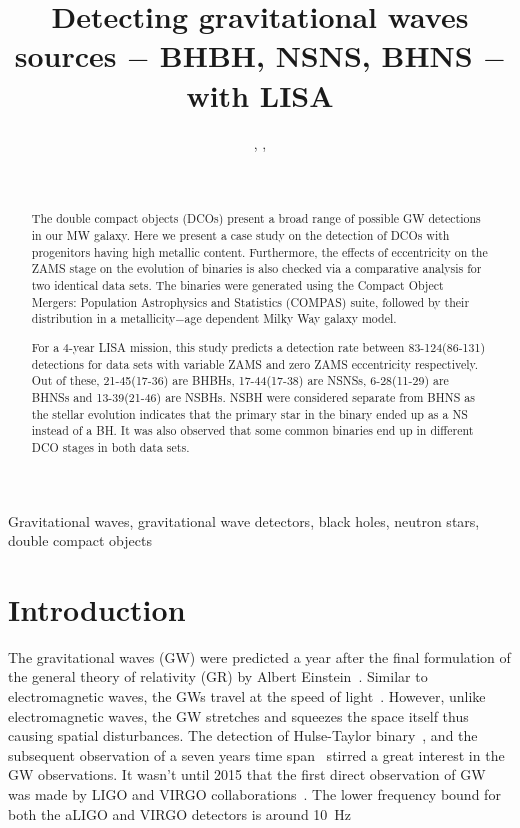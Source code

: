 \documentclass[journal, twocolumns]{IEEEtran}
\title{Detecting gravitational waves sources $-$ BHBH, NSNS, BHNS $-$ with LISA}
\author{
    \IEEEauthorblockN{Nazeela Aimen},
    \IEEEauthorblockN{Syed Ali Mohsin Bukhari},
    \IEEEauthorblockN{Asad Ali}
    \and\\
    \IEEEauthorblockA{
        \textit{
            Department of Applied Mathematics and Statistics, Institute of Space Technology, Islamabad 44000, Pakistan.
        }\\
    }
    \IEEEauthorblockA{
        \textit{
            Space and Astrophysics Research Lab (SARL), Institute of Space Technology, Islamabad 44000, Pakistan.
        }
    }
}
\begin{document}
    \maketitle
    \IEEEpeerreviewmaketitle
    \begin{abstract}
        The double compact objects (DCOs) present a broad range of possible GW detections in our MW galaxy. Here we present a case study on the detection of DCOs with progenitors having high metallic content. Furthermore, the effects of eccentricity on the ZAMS stage on the evolution of binaries is also checked via a comparative analysis for two identical data sets. The binaries were generated using the Compact Object Mergers: Population Astrophysics and Statistics (COMPAS) suite, followed by their distribution in a metallicity$-$age dependent Milky Way galaxy model.

        For a 4-year LISA mission, this study predicts a detection rate between 83-124(86-131) detections for data sets with variable ZAMS and zero ZAMS eccentricity respectively. Out of these, 21-45(17-36) are BHBHs, 17-44(17-38) are NSNSs, 6-28(11-29) are BHNSs and 13-39(21-46) are NSBHs.
        NSBH were considered separate from BHNS as the stellar evolution indicates that the primary star in the binary ended up as a NS instead of a BH.
        It was also observed that some common binaries end up in different DCO stages in both data sets.
	\end{abstract}
    \begin{IEEEkeywords}
        Gravitational waves, gravitational wave detectors, black holes, neutron stars, double compact objects
    \end{IEEEkeywords}



    \section{Introduction}
    \label{sec:intro}
    The gravitational waves (GW) were predicted a year after the final formulation of the general theory of relativity (GR) by Albert Einstein~\cite{Einstein1916}.
    Similar to electromagnetic waves, the GWs travel at the speed of light~\citep{Eddington1922, Abott2017}.
    However, unlike electromagnetic waves, the GW stretches and squeezes the space itself thus causing spatial disturbances.
    The detection of Hulse-Taylor binary~\citep{Hulse1975}, and the subsequent observation of a seven years time span~\citep{Taylor1982} stirred a great interest in the GW observations.
    It wasn't until 2015 that the first direct observation of GW was made by LIGO and VIRGO collaborations~\citep{Abott2017}.
    The lower frequency bound for both the aLIGO and VIRGO detectors is around \SI{10}{\hertz}~\cite{aLIGO2015, aVIRGO2014}
\end{document}
